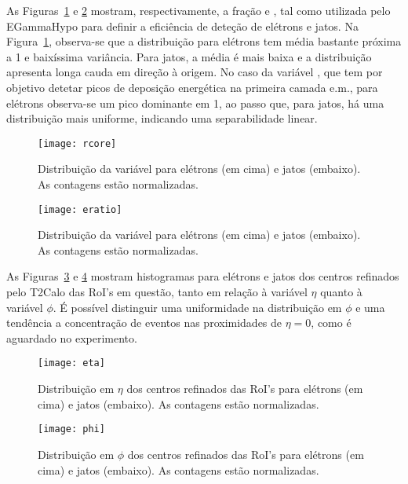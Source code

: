 As Figuras~\ref{fig:rcore} e \ref{fig:eratio} mostram, respectivamente, a
fração \rcore e \eratio, tal como utilizada pelo EGammaHypo para definir a
eficiência de deteção de elétrons e jatos. Na Figura~\ref{fig:rcore},
observa-se que a distribuição para elétrons tem média bastante próxima a 1 e
baixíssima variância. Para jatos, a média é mais baixa e a distribuição
apresenta longa cauda em direção à origem. No caso da variável \eratio, que
tem por objetivo detetar picos de deposição energética na primeira camada
e.m., para elétrons observa-se um pico dominante em 1, ao passo que, para
jatos, há uma distribuição mais uniforme, indicando uma separabilidade
linear.

\begin{figure}
\begin{center}
\texttt{[image: rcore]}
\end{center}
\caption{Distribuição da variável \rcore para elétrons (em cima) e jatos
(embaixo). As contagens estão normalizadas.}
\label{fig:rcore}
\end{figure}

\begin{figure}
\begin{center}
\texttt{[image: eratio]}
\end{center}
\caption{Distribuição da variável \eratio para elétrons (em cima) e jatos
(embaixo). As contagens estão normalizadas.}
\label{fig:eratio}
\end{figure}

As Figuras~\ref{fig:eta} e \ref{fig:phi} mostram histogramas para elétrons e
jatos dos centros refinados pelo T2Calo das RoI's em questão, tanto em relação
à variável $\eta$ quanto à variável $\phi$. É possível distinguir uma
uniformidade na distribuição em $\phi$ e uma tendência a concentração de
eventos nas proximidades de $\eta=0$, como é aguardado no experimento.

\begin{figure}
\begin{center}
\texttt{[image: eta]}
\end{center}
\caption{Distribuição em $\eta$ dos centros refinados das RoI's para elétrons
(em cima) e jatos (embaixo). As contagens estão normalizadas.}
\label{fig:eta}
\end{figure}

\begin{figure}
\begin{center}
\texttt{[image: phi]}
\end{center}
\caption{Distribuição em $\phi$ dos centros refinados das RoI's para elétrons
(em cima) e jatos (embaixo). As contagens estão normalizadas.}
\label{fig:phi}
\end{figure}

